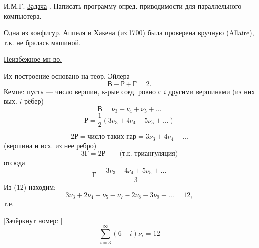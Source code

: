 И.М.Г. \underline{Задача} .
Написать программу опред. приводимости для
параллельного компьютера.

Одна из конфигур. Аппеля и Хакена (из 1700) была проверена
вручную (Allaire), т.к. не бралась машиной.

\underline{Неизбежное мн-во.}

Их построение основано на теор. Эйлера
\begin{equation*}
\mathrm{В}-\mathrm{Р}+\mathrm{Г}=2.\tag{12}
\end{equation*}
\underline{Кемпе:} пусть  — число вершин, к-рые соед. ровно
с $i$ другими вершинами (из них вых. $i$ рёбер)
\begin{equation*}
\mathrm{В}=\nu_3+\nu_4+\nu_5+\ldots\tag{13}
\end{equation*}
\begin{equation*}
\mathrm{Р}=\frac{1}{2}(3\nu_3+4\nu_4+5\nu_5+\ldots)\tag{14}
\end{equation*}
\begin{center}
\end{center}
\begin{equation*}
2\mathrm{Р}=\text{число таких пар}=3\nu_3+4\nu_4+\ldots
\end{equation*}
(вершина и исх. из нее ребро)
\begin{equation*}
3\mathrm{Г}=2\mathrm{Р}\qquad\text{(т.к. триангуляция)}\tag{15}
\end{equation*}
отсюда
\begin{equation*}
\mathrm{Г}=\frac{3\nu_3+4\nu_4+5\nu_5+\ldots}{3}\tag{15'}
\end{equation*}
Из (12) находим:
\begin{equation*}
3\nu_3+2\nu_4+\nu_5-\nu_7-2\nu_8-3\nu_9-\ldots=12,\tag{16}
\end{equation*}
т.е.

[Зачёркнут номер: ]
\begin{equation*}
\sum_{i=3}^{\infty}(6-i)\nu_i=12\tag{16'}
\end{equation*}


